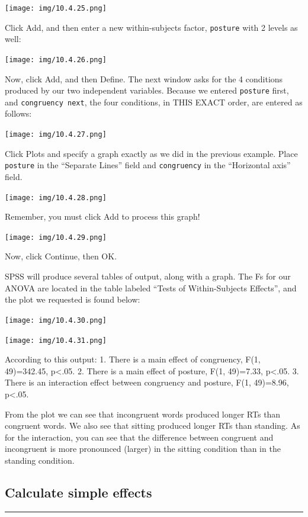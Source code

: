 \documentclass[]{book}
\begin{document}
\texttt{[image: img/10.4.25.png]}

Click {Add}, and then enter a new within-subjects factor,
\texttt{posture} with 2 levels as well:

\texttt{[image: img/10.4.26.png]}

Now, click {Add}, and then Define. The next window asks for the 4
conditions produced by our two independent variables. Because we entered
\texttt{posture} first, and \texttt{congruency\ next}, the four
conditions, in THIS EXACT order, are entered as follows:

\texttt{[image: img/10.4.27.png]}

Click {Plots} and specify a graph exactly as we did in the previous
example. Place \texttt{posture} in the ``Separate Lines'' field and
\texttt{congruency} in the ``Horizontal axis'' field.

\texttt{[image: img/10.4.28.png]}

Remember, you must click {Add} to process this graph!

\texttt{[image: img/10.4.29.png]}

Now, click {Continue}, then {OK}.

SPSS will produce several tables of output, along with a graph. The Fs
for our ANOVA are located in the table labeled ``Tests of
Within-Subjects Effects'', and the plot we requested is found below:

\texttt{[image: img/10.4.30.png]}

\texttt{[image: img/10.4.31.png]}

According to this output: 1. There is a main effect of congruency, F(1,
49)=342.45, p\textless{}.05. 2. There is a main effect of posture, F(1,
49)=7.33, p\textless{}.05. 3. There is an interaction effect between
congruency and posture, F(1, 49)=8.96, p\textless{}.05.

From the plot we can see that incongruent words produced longer RTs than
congruent words. We also see that sitting produced longer RTs than
standing. As for the interaction, you can see that the difference
between congruent and incongruent is more pronounced (larger) in the
sitting condition than in the standing condition.

\subsection{Calculate simple effects}\label{calculate-simple-effects-1}

\begin{center}\rule{0.5\linewidth}{0.5pt}\end{center}
\end{document}
